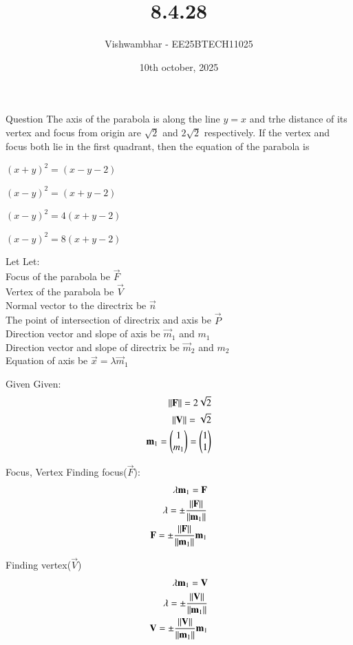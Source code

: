 \documentclass{beamer}
\title{8.4.28}
\date{10th october, 2025}
\author{Vishwambhar - EE25BTECH11025}
\begin{document}
\frame{\titlepage}
\begin{frame}{Question}
The axis of the parabola is along the line $y=x$ and trhe distance of its vertex and focus from origin are $\sqrt{2}$ and $2\sqrt{2}$ respectively. If the vertex and focus both lie in the first quadrant, then the equation of the parabola is
\begin{enumerate}
\begin{multicols}{2}
    \item $(x+y)^2=(x-y-2)$
    \item $(x-y)^2=(x+y-2)$
    \item $(x-y)^2=4(x+y-2)$
    \item $(x-y)^2=8(x+y-2)$
\end{multicols}
\end{enumerate}\end{frame}

\begin{frame}{Let}
Let:\\
Focus of the parabola be $\vec{F}$\\
Vertex of the parabola be $\vec{V}$\\
Normal vector to the directrix be $\vec{n}$\\
The point of intersection of directrix and axis be $\vec{P}$\\
Direction vector and slope of axis be $\vec{m}_1$ and $m_1$\\
Direction vector and slope of directrix be $\vec{m}_2$ and $m_2$\\
Equation of axis be $\vec{x}=\lambda\vec{m}_1$\\
\end{frame}

\begin{frame}{Given}
Given:
\begin{align}
    \left\lVert\mathbf{F}\right\rVert = 2\sqrt{2}\\
    \left\lVert\mathbf{V}\right\rVert = \sqrt{2}\\
    \mathbf{m}_1 = \begin{pmatrix}1\\m_1\end{pmatrix}=\begin{pmatrix}1\\1\end{pmatrix}
\end{align}
\end{frame}

\begin{frame}{Focus, Vertex}
Finding focus($\vec{F}$):
\begin{align}
    \lambda\mathbf{m}_1=\mathbf{F}\\
    \lambda = \pm\frac{\left\lVert\mathbf{F}\right\rVert}{\left\lVert\mathbf{m}_1\right\rVert}\\
    \mathbf{F} = \pm\frac{\left\lVert\mathbf{F}\right\rVert}{\left\lVert\mathbf{m}_1\right\rVert}\mathbf{m}_1
\end{align}

Finding vertex($\vec{V}$)
\begin{align}
    \lambda\mathbf{m}_1=\mathbf{V}\\
    \lambda = \pm\frac{\left\lVert\mathbf{V}\right\rVert}{\left\lVert\mathbf{m}_1\right\rVert}\\
    \mathbf{V} = \pm\frac{\left\lVert\mathbf{V}\right\rVert}{\left\lVert\mathbf{m}_1\right\rVert}\mathbf{m}_1
\end{align}
\end{frame}
\end{document}
